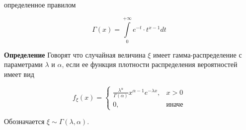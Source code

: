 определенное правилом

\begin{equation*}
	\Gamma(x) =
	\int\limits_0^{+\infty} e^{-t} \cdot t^{x-1} dt
\end{equation*}

\textbf{Определение} Говорят что случайная величина $\xi$ имеет гамма-распределение с параметрами $\lambda$ и $\alpha$, если ее функция плотности распределения вероятностей имеет вид

\begin{equation*}
	f_{\xi}(x) =
	\begin{cases}
		\frac{\lambda^{\alpha}}{\Gamma(\alpha)}x^{\alpha-1}e^{-\lambda x}, & x > 0\\
		0, & \text{иначе}
	\end{cases}
\end{equation*}

Обозначается $\xi \sim \Gamma(\lambda, \alpha)$.